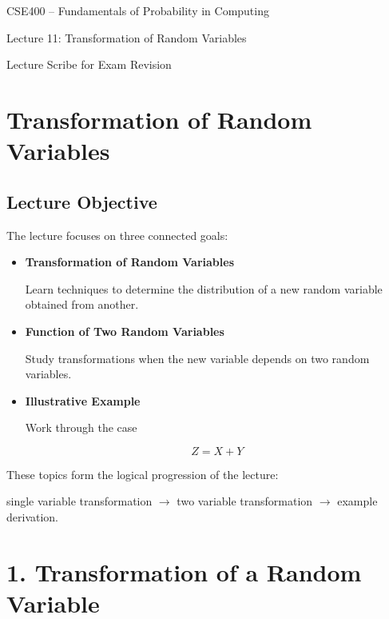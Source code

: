 \documentclass{article}
\begin{document}
\begin{center}
{\LARGE CSE400 -- Fundamentals of Probability in Computing}

\vspace{0.5cm}

{\Large Lecture 11: Transformation of Random Variables}

\vspace{0.5cm}

{\large Lecture Scribe for Exam Revision}
\end{center}

\vspace{1cm}

\section*{Transformation of Random Variables}

\subsection*{Lecture Objective}

The lecture focuses on three connected goals:

\begin{itemize}
\item \textbf{Transformation of Random Variables}

Learn techniques to determine the distribution of a new random variable obtained from another.

\item \textbf{Function of Two Random Variables}

Study transformations when the new variable depends on two random variables.

\item \textbf{Illustrative Example}

Work through the case

\[
Z = X + Y
\]
\end{itemize}

These topics form the logical progression of the lecture:

single variable transformation $\rightarrow$ two variable transformation $\rightarrow$ example derivation.

\section*{1. Transformation of a Random Variable}
\end{document}
